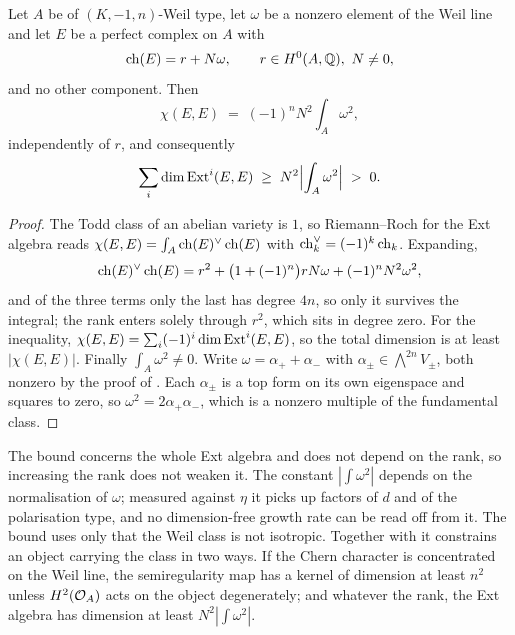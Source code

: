 \begin{proposition}%
\label{prop:objectsize}
Let $A$ be of $(K,-1,n)$-Weil type, let $\omega$ be a nonzero element of the
Weil line and let $E$ be a perfect complex on $A$ with
\[
  \operatorname{ch}(E)=r+N\omega,\qquad r\in H^{0}(A,\mathbb{Q}),\ N\ne0,
\]
and no other component. Then
\[
  \chi(E,E)\;=\;(-1)^{n}N^{2}\!\int_{A}\omega^{2},
\]
independently of $r$, and consequently
\[
  \sum_{i}\dim\operatorname{Ext}^{i}(E,E)\;\ge\;N^{2}\Bigl|\int_{A}\omega^{2}\Bigr|\;>\;0 .
\]
\end{proposition}

\begin{proof}
The Todd class of an abelian variety is $1$, so Riemann--Roch for the Ext
algebra reads $\chi(E,E)=\int_{A}\operatorname{ch}(E)^{\vee}\operatorname{ch}(E)$ with
$\operatorname{ch}_{k}^{\vee}=(-1)^{k}\operatorname{ch}_{k}$. Expanding,
\[
  \operatorname{ch}(E)^{\vee}\operatorname{ch}(E)
  = r^{2}+\bigl(1+(-1)^{n}\bigr)rN\omega+(-1)^{n}N^{2}\omega^{2},
\]
and of the three terms only the last has degree $4n$, so only it survives the
integral; the rank enters solely through $r^{2}$, which sits in degree zero.
For the inequality, $\chi(E,E)=\sum_{i}(-1)^{i}\dim\operatorname{Ext}^{i}(E,E)$, so the
total dimension is at least $|\chi(E,E)|$. Finally $\int_{A}\omega^{2}\ne0$.
Write $\omega=\alpha_{+}+\alpha_{-}$ with $\alpha_{\pm}\in\bigwedge^{2n}V_{\pm}$,
both nonzero by the proof of . Each $\alpha_{\pm}$ is a
top form on its own eigenspace and squares to zero, so
$\omega^{2}=2\alpha_{+}\alpha_{-}$, which is a nonzero multiple of the
fundamental class.
\end{proof}

\begin{remark}\label{rem:sizeconstant}
The bound concerns the whole Ext algebra and does not depend on the rank, so
increasing the rank does not weaken it. The constant $|\int\omega^{2}|$
depends on the normalisation of $\omega$; measured against $\eta$ it picks up
factors of $d$ and of the polarisation type, and no dimension-free growth
rate can be read off from it. The bound uses only that the Weil class is not
isotropic. Together with  it constrains an object
carrying the class in two ways. If the Chern character is concentrated on the
Weil line, the semiregularity map has a kernel of dimension at least $n^{2}$
unless $H^{2}(\mathcal{O}_{A})$ acts on the object degenerately; and whatever the
rank, the Ext algebra has dimension at least $N^{2}|\int\omega^{2}|$.
\end{remark}

